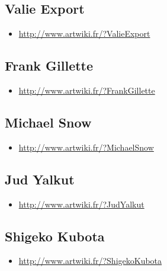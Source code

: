 \documentclass[
]{book}
\providecommand{\tightlist}{%
  \setlength{\itemsep}{0pt}\setlength{\parskip}{0pt}}
\begin{document}
\hypertarget{valie-export}{%
\subsection{Valie Export}\label{valie-export}}

\begin{itemize}
\tightlist
\item
  \url{http://www.artwiki.fr/?ValieExport}
\end{itemize}

\hypertarget{frank-gillette}{%
\subsection{Frank Gillette}\label{frank-gillette}}

\begin{itemize}
\tightlist
\item
  \url{http://www.artwiki.fr/?FrankGillette}
\end{itemize}

\hypertarget{michael-snow}{%
\subsection{Michael Snow}\label{michael-snow}}

\begin{itemize}
\tightlist
\item
  \url{http://www.artwiki.fr/?MichaelSnow}
\end{itemize}

\hypertarget{jud-yalkut}{%
\subsection{Jud Yalkut}\label{jud-yalkut}}

\begin{itemize}
\tightlist
\item
  \url{http://www.artwiki.fr/?JudYalkut}
\end{itemize}

\hypertarget{shigeko-kubota}{%
\subsection{Shigeko Kubota}\label{shigeko-kubota}}

\begin{itemize}
\tightlist
\item
  \url{http://www.artwiki.fr/?ShigekoKubota}
\end{itemize}
\end{document}
